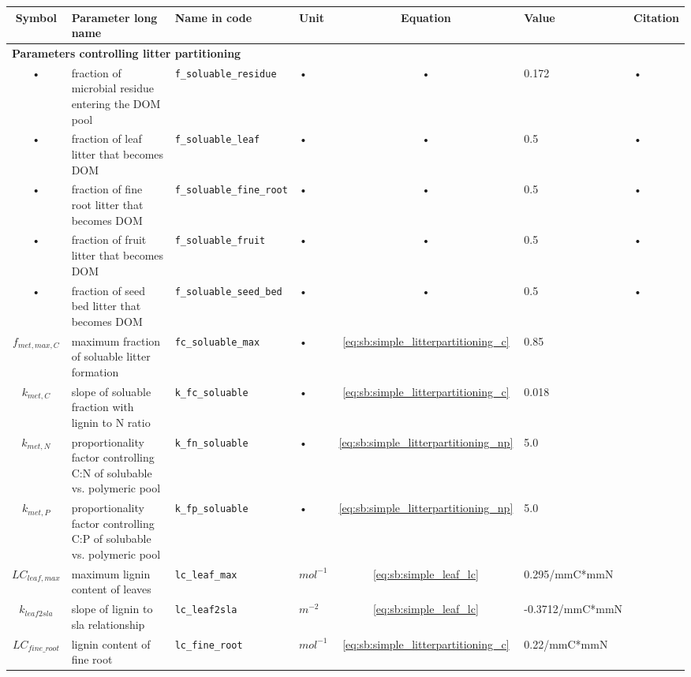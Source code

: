 \begin{table}
\begin{tabularx}{\linewidth}{|c|X|l|l|c|l|X|} %
\hline 
Symbol & Parameter long name & Name in code & Unit & Equation & Value & Citation \\ 
\hline 

\multicolumn{6}{l}{\bf Parameters controlling litter partitioning}\\
\hline
• & fraction of microbial residue entering the DOM pool & \texttt{f\_soluable\_residue} & • & • & 0.172 & • \\
• & fraction of leaf litter that becomes DOM & \texttt{f\_soluable\_leaf} & • & • & 0.5 & • \\
• & fraction of fine root litter that becomes DOM & \texttt{f\_soluable\_fine\_root} & • & • & 0.5 & • \\
• & fraction of fruit litter that becomes DOM & \texttt{f\_soluable\_fruit} & • & • & 0.5 & • \\
• & fraction of seed bed litter that becomes DOM & \texttt{f\_soluable\_seed\_bed} & • & • & 0.5 & • \\
$f_{met,max,C}$ & maximum fraction of soluable litter formation & \texttt{fc\_soluable\_max} & • & \ref{eq:sb:simple_litterpartitioning_c} &  0.85 & \cite{Parton:1993ud}\\
$k_{met,C}$ & slope of soluable fraction with lignin to N ratio & \texttt{k\_fc\_soluable} & • & \ref{eq:sb:simple_litterpartitioning_c} &  0.018 & \cite{Parton:1993ud}\\
$k_{met,N}$ & proportionality factor controlling C:N of solubable vs. polymeric pool  & \texttt{k\_fn\_soluable} & • & \ref{eq:sb:simple_litterpartitioning_np} & 5.0 & \cite{Parton:1993ud}\\
$k_{met,P}$ & proportionality factor controlling C:P of solubable vs. polymeric pool & \texttt{k\_fp\_soluable} & • & \ref{eq:sb:simple_litterpartitioning_np} & 5.0 & \cite{Parton:1993ud}\\
$LC_{leaf,max}$ & maximum lignin content of leaves & \texttt{lc\_leaf\_max} & $mol^{-1}$ &  \ref{eq:sb:simple_leaf_lc} & 0.295/mmC*mmN & \cite{White:2000vl}\\
$k_{leaf2sla}$ & slope of lignin to sla relationship & \texttt{lc\_leaf2sla} & $m^{-2}$ &  \ref{eq:sb:simple_leaf_lc} & -0.3712/mmC*mmN & \cite{White:2000vl}\\
$LC_{fine\_root}$ & lignin content of fine root & \texttt{lc\_fine\_root} & $mol^{-1}$ &  \ref{eq:sb:simple_litterpartitioning_c} & 0.22/mmC*mmN & \cite{White:2000vl}\\

\end{tabularx}
\end{table}

